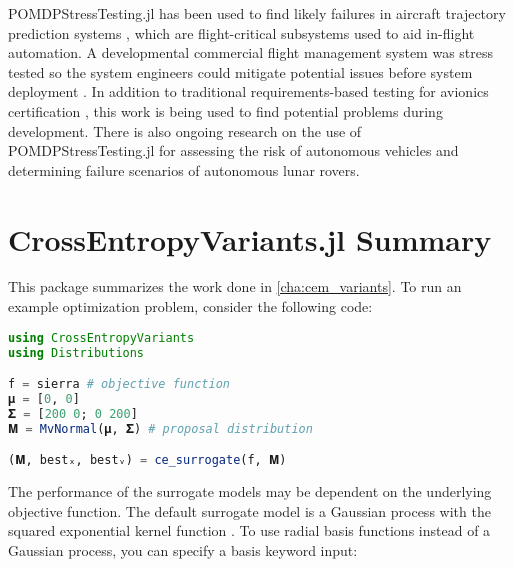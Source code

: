 POMDPStressTesting.jl has been used to find likely failures in aircraft trajectory prediction systems \cite{ast_fms}, which are flight-critical subsystems used to aid in-flight automation.
A developmental commercial flight management system was stress tested so the system engineers could mitigate potential issues before system deployment \cite{ast_fms}.
In addition to traditional requirements-based testing for avionics certification \cite{do178c}, this work is being used to find potential problems during development.
There is also ongoing research on the use of POMDPStressTesting.jl for assessing the risk of autonomous vehicles and determining failure scenarios of autonomous lunar rovers. 





\section{CrossEntropyVariants.jl Summary}

This package summarizes the work done in \cref{cha:cem_variants}.
To run an example optimization problem, consider the following code:

\begin{lstlisting}[language=Julia]
using CrossEntropyVariants
using Distributions

f = sierra # objective function
𝛍 = [0, 0]
𝚺 = [200 0; 0 200]
𝐌 = MvNormal(𝛍, 𝚺) # proposal distribution

(𝐌, bestₓ, bestᵥ) = ce_surrogate(f, 𝐌)
\end{lstlisting}

The performance of the surrogate models may be dependent on the underlying objective function. The default surrogate model is a Gaussian process with the squared exponential kernel function \cite{Kochenderfer2019}. To use radial basis functions instead of a Gaussian process, you can specify a basis keyword input:

